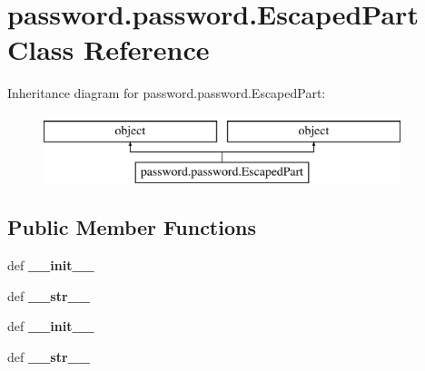 \hypertarget{classpassword_1_1password_1_1EscapedPart}{\section{password.\-password.\-Escaped\-Part Class Reference}
\label{classpassword_1_1password_1_1EscapedPart}
}
Inheritance diagram for password.\-password.\-Escaped\-Part\-:\begin{figure}[H]
\begin{center}
\leavevmode
\includegraphics[height=2.000000cm]{classpassword_1_1password_1_1EscapedPart}
\end{center}
\end{figure}
\subsection*{Public Member Functions}
\begin{DoxyCompactItemize}
\item 
\hypertarget{classpassword_1_1password_1_1EscapedPart_ac0480fa8b823e218d2a159c00b2af28e}{def {\bfseries \-\_\-\-\_\-init\-\_\-\-\_\-}}\label{classpassword_1_1password_1_1EscapedPart_ac0480fa8b823e218d2a159c00b2af28e}

\item 
\hypertarget{classpassword_1_1password_1_1EscapedPart_aa6c689420d06baffb374a01035dad908}{def {\bfseries \-\_\-\-\_\-str\-\_\-\-\_\-}}\label{classpassword_1_1password_1_1EscapedPart_aa6c689420d06baffb374a01035dad908}

\item 
\hypertarget{classpassword_1_1password_1_1EscapedPart_ac0480fa8b823e218d2a159c00b2af28e}{def {\bfseries \-\_\-\-\_\-init\-\_\-\-\_\-}}\label{classpassword_1_1password_1_1EscapedPart_ac0480fa8b823e218d2a159c00b2af28e}

\item 
\hypertarget{classpassword_1_1password_1_1EscapedPart_aa6c689420d06baffb374a01035dad908}{def {\bfseries \-\_\-\-\_\-str\-\_\-\-\_\-}}\label{classpassword_1_1password_1_1EscapedPart_aa6c689420d06baffb374a01035dad908}

\end{DoxyCompactItemize}
